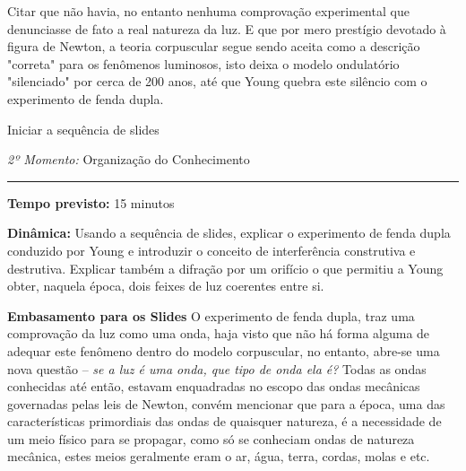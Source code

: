     
    Citar que não havia, no entanto nenhuma comprovação experimental que denunciasse de fato a real natureza da luz. E que por mero prestígio devotado à figura de Newton, a teoria corpuscular segue sendo aceita como a descrição "correta" para os fenômenos luminosos, isto deixa o modelo ondulatório "silenciado" por cerca de 200 anos, até que Young quebra este silêncio com o experimento de fenda dupla.

    Iniciar a sequência de slides





    \bigskip{}
    \noindent\emph{2º Momento:} Organização do Conhecimento
    \par\noindent\rule{.3\textwidth}{.5pt}  
    \par\noindent\textbf{Tempo previsto:} 15 minutos
    \smallskip
    \par\noindent\textbf{Dinâmica:} Usando a sequência de slides, explicar o experimento de fenda dupla conduzido por Young e introduzir o conceito de interferência construtiva e destrutiva. Explicar também a difração por um orifício o que permitiu a Young obter, naquela época, dois feixes de luz coerentes entre si.  
    

    \noindent\textbf{Embasamento para os Slides}
    O experimento de fenda dupla, traz uma comprovação da luz como uma onda, haja visto que não há forma alguma de adequar este fenômeno dentro do modelo corpuscular, no entanto, abre-se uma nova questão -- \emph{se a luz é uma onda, que tipo de onda ela é?} Todas as ondas conhecidas até então, estavam enquadradas no escopo das ondas mecânicas governadas pelas leis de Newton, convém mencionar que para a época, uma das características primordiais das ondas de quaisquer natureza, é a necessidade de um meio físico para se propagar, como só se conheciam ondas de natureza mecânica, estes meios geralmente eram o ar, água, terra, cordas, molas e etc. 

